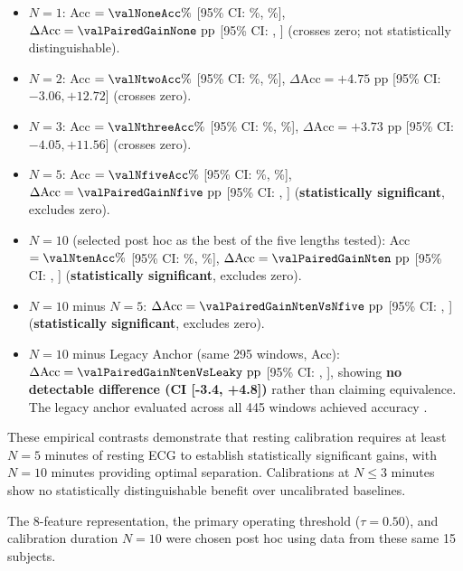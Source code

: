\documentclass[preprint,12pt,3p]{elsarticle}
\begin{document}
\begin{itemize}
    \item $N=1$: Acc $= \valNoneAcc\%$ [95\% CI: \valNoneAccCILow\%, \valNoneAccCIHigh\%], $\Delta\text{Acc} = \valPairedGainNone\text{ pp}$ [95\% CI: \valPairedGainNoneCILow, \valPairedGainNoneCIHigh] (crosses zero; not statistically distinguishable).
    \item $N=2$: Acc $= \valNtwoAcc\%$ [95\% CI: \valNtwoAccCILow\%, \valNtwoAccCIHigh\%], $\Delta\text{Acc} = +4.75\text{ pp}$ [95\% CI: $-3.06, +12.72$] (crosses zero).
    \item $N=3$: Acc $= \valNthreeAcc\%$ [95\% CI: \valNthreeAccCILow\%, \valNthreeAccCIHigh\%], $\Delta\text{Acc} = +3.73\text{ pp}$ [95\% CI: $-4.05, +11.56$] (crosses zero).
    \item $N=5$: Acc $= \valNfiveAcc\%$ [95\% CI: \valNfiveAccCILow\%, \valNfiveAccCIHigh\%], $\Delta\text{Acc} = \valPairedGainNfive\text{ pp}$ [95\% CI: \valPairedGainNfiveCILow, \valPairedGainNfiveCIHigh] (\textbf{statistically significant}, excludes zero).
    \item $N=10$ (selected post hoc as the best of the five lengths tested): Acc $= \valNtenAcc\%$ [95\% CI: \valNtenAccCILow\%, \valNtenAccCIHigh\%], $\Delta\text{Acc} = \valPairedGainNten\text{ pp}$ [95\% CI: \valPairedGainNtenCILow, \valPairedGainNtenCIHigh] (\textbf{statistically significant}, excludes zero).
    \item $N=10$ minus $N=5$: $\Delta\text{Acc} = \valPairedGainNtenVsNfive\text{ pp}$ [95\% CI: \valPairedGainNtenVsNfiveCILow, \valPairedGainNtenVsNfiveCIHigh] (\textbf{statistically significant}, excludes zero).
    \item $N=10$ minus Legacy Anchor (same 295 windows, \valControlLeakyTwoNineFiveAccPct Acc): $\Delta\text{Acc} = \valPairedGainNtenVsLeaky\text{ pp}$ [95\% CI: \valPairedGainNtenVsLeakyCILow, \valPairedGainNtenVsLeakyCIHigh], showing \textbf{no detectable difference (CI [-3.4, +4.8])} rather than claiming equivalence. The legacy anchor evaluated across all 445 windows achieved \valLegacyFourFourFiveAccPct accuracy \valLegacyFourFourFiveAccCI.
\end{itemize}
These empirical contrasts demonstrate that resting calibration requires at least $N=5$ minutes of resting ECG to establish statistically significant gains, with $N=10$ minutes providing optimal separation. Calibrations at $N \le 3$ minutes show no statistically distinguishable benefit over uncalibrated baselines.

The 8-feature representation, the primary operating threshold ($\tau = 0.50$), and calibration duration $N=10$ were chosen post hoc using data from these same 15 subjects.
\end{document}
